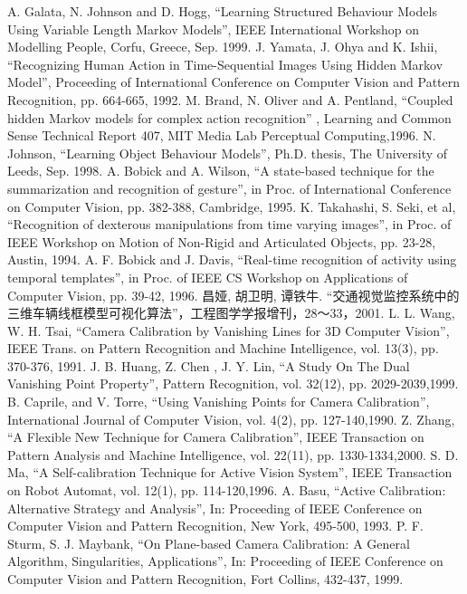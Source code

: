 \begin{thebibliography}{200}
 A. Galata, N. Johnson and D. Hogg, ``Learning Structured Behaviour Models Using Variable Length Markov Models”, IEEE International Workshop on Modelling People, Corfu, Greece, Sep. 1999.
 J. Yamata, J. Ohya and K. Ishii, ``Recognizing Human Action in Time-Sequential Images Using Hidden Markov Model'', Proceeding of International Conference on Computer Vision and Pattern Recognition, pp. 664-665, 1992.
 M. Brand, N. Oliver and A. Pentland, “Coupled hidden Markov models for complex action recognition” , Learning and Common Sense Technical Report 407, MIT Media Lab Perceptual Computing,1996.
 N. Johnson, “Learning Object Behaviour Models”, Ph.D. thesis, The University of Leeds, Sep. 1998.
 A. Bobick and A. Wilson, ``A state-based technique for the summarization and recognition of gesture'', in Proc. of International Conference on Computer Vision, pp. 382-388, Cambridge, 1995.
 K. Takahashi, S. Seki, et al, ``Recognition of dexterous manipulations from time varying images'', in Proc. of IEEE Workshop on Motion of Non-Rigid and Articulated Objects, pp. 23-28, Austin, 1994.
 A. F. Bobick and J. Davis, ``Real-time recognition of activity using temporal templates'', in Proc. of IEEE CS Workshop on Applications of Computer Vision, pp. 39-42, 1996.
 昌娅, 胡卫明, 谭铁牛. ``交通视觉监控系统中的三维车辆线框模型可视化算法''，工程图学学报增刊，28～33，2001.
 L. L. Wang, W. H. Tsai, ``Camera Calibration by Vanishing Lines for 3D Computer Vision'', IEEE Trans. on Pattern Recognition and Machine Intelligence, vol. 13(3), pp. 370-376, 1991.
J. B. Huang, Z. Chen , J. Y. Lin, ``A Study On The Dual Vanishing Point Property'', Pattern Recognition, vol. 32(12), pp. 2029-2039,1999.
 B. Caprile, and V. Torre, ``Using Vanishing Points for Camera Calibration'', International Journal of Computer Vision, vol. 4(2), pp. 127-140,1990.
 Z. Zhang, ``A Flexible New Technique for Camera Calibration'', IEEE Transaction on Pattern Analysis and Machine Intelligence, vol. 22(11), pp. 1330-1334,2000.
 S. D. Ma, ``A Self-calibration Technique for Active Vision System'', IEEE Transaction on Robot Automat, vol. 12(1), pp. 114-120,1996.
 A. Basu, ``Active Calibration: Alternative Strategy and Analysis'', In: Proceeding of IEEE Conference on Computer Vision and Pattern Recognition, New York, 495-500, 1993.
 P. F. Sturm, S. J. Maybank, ``On Plane-based Camera Calibration: A General Algorithm, Singularities, Applications'', In: Proceeding of IEEE Conference on Computer Vision and Pattern Recognition, Fort Collins, 432-437, 1999.

\end{thebibliography}
